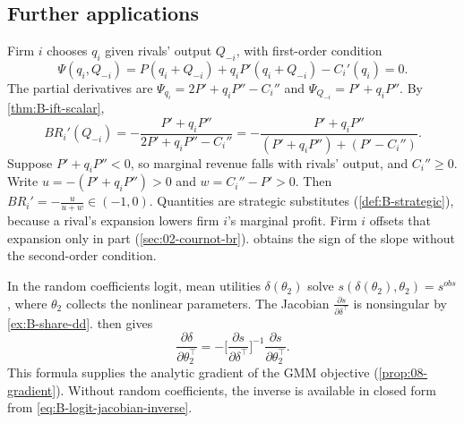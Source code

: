 \subsection{Further applications}\label{sec:B-ift-apps}

\begin{example}\label{ex:B-cournot-br}
Firm $i$ chooses $q_i$ given rivals' output $Q_{-i}$, with first-order condition
\begin{equation*}
\Psi(q_i, Q_{-i}) = P(q_i + Q_{-i}) + q_iP'(q_i + Q_{-i}) - C_i'(q_i) = 0 .
\end{equation*}
The partial derivatives are $\Psi_{q_i} = 2P' + q_iP'' - C_i''$ and $\Psi_{Q_{-i}} = P' + q_iP''$. By
\cref{thm:B-ift-scalar},
\begin{equation*}
BR_i'(Q_{-i}) = -\frac{P' + q_iP''}{2P' + q_iP'' - C_i''} = -\frac{P' + q_iP''}{(P' + q_iP'') + (P' - C_i'')} .
\end{equation*}
Suppose $P' + q_iP'' < 0$, so marginal revenue falls with rivals' output, and $C_i'' \geq 0$. Write
$u = -(P' + q_iP'') > 0$ and $w = C_i'' - P' > 0$. Then $BR_i' = -\frac{u}{u + w} \in (-1, 0)$. Quantities are strategic
substitutes (\cref{def:B-strategic}), because a rival's expansion lowers firm $i$'s marginal profit. Firm $i$ offsets
that expansion only in part (\cref{sec:02-cournot-br}). 
obtains the sign of the slope without the second-order condition.
\end{example}

\begin{example}\label{ex:B-inversion-gradient}
In the random coefficients logit, mean utilities $\delta(\theta_2)$ solve $s(\delta(\theta_2), \theta_2) = s^{obs}$, where $\theta_2$
collects the nonlinear parameters. The Jacobian $\frac{\partial s}{\partial \delta^\top}$ is nonsingular by
\cref{ex:B-share-dd}.  then gives
\begin{equation*}
\frac{\partial \delta}{\partial \theta_2^\top} = -\Big[\frac{\partial s}{\partial \delta^\top}\Big]^{-1}\frac{\partial s}{\partial \theta_2^\top} .
\end{equation*}
This formula supplies the analytic gradient of the GMM objective (\cref{prop:08-gradient}). Without random
coefficients, the inverse is available in closed form from \eqref{eq:B-logit-jacobian-inverse}.
\end{example}

